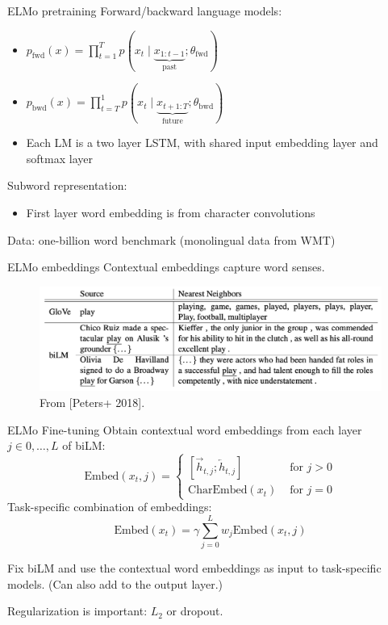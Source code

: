 \documentclass[usenames,dvipsnames,11pt,aspectratio=169]{beamer}
\begin{document}
\begin{frame}
    {ELMo pretraining}
        Forward/backward language models:\\
            \begin{itemize}
                \item $p_{\text{fwd}}(x) = \prod_{t=1}^T p(x_t\mid \underbrace{x_{1:t-1}}_{\text{past}}; \theta_{\text{fwd}})$
                \item $p_{\text{bwd}}(x) = \prod_{t=T}^1 p(x_t\mid \underbrace{x_{t+1:T}}_{\text{future}}; \theta_{\text{bwd}})$
                \item Each LM is a two layer LSTM,
                with shared input embedding layer and softmax layer
            \end{itemize}

        Subword representation:\\
            \begin{itemize}
                \item First layer word embedding is from character convolutions
            \end{itemize}

        Data: one-billion word benchmark (monolingual data from WMT)
\end{frame}

\begin{frame}
    {ELMo embeddings}
    Contextual embeddings capture word senses.
    \begin{figure}
        \includegraphics[width=.9\textwidth]{figures/elmo-ex}
        \caption{From [Peters+ 2018].}
    \end{figure}
\end{frame}

\begin{frame}
    {ELMo Fine-tuning}
    Obtain contextual word embeddings from each layer $j\in{0, \ldots, L}$ of biLM:
    $$
        \text{Embed}(x_t, j) = \begin{cases}
            [\overrightarrow{h}_{t,j}; \overleftarrow{h}_{t,j}] & \text{ for } j > 0 \\
            \text{CharEmbed}(x_t) & \text{ for } j = 0
        \end{cases}
    $$
    Task-specific combination of embeddings:
    $$
    \text{Embed}(x_t) = \gamma \sum_{j=0}^L w_j\text{Embed}(x_t, j)
    $$

    Fix biLM and use the contextual word embeddings as input to task-specific models. (Can also add to the output layer.)

    Regularization is important: $L_2$ or dropout.
\end{frame}
\end{document}
